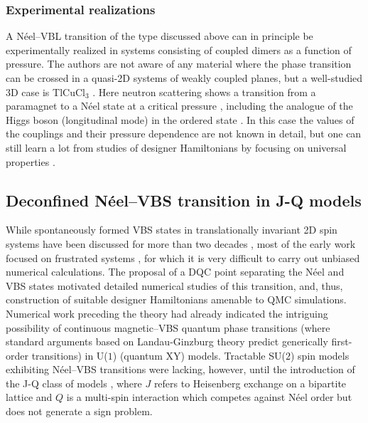 \documentclass[10pt,pre,aps,twocolumn,showpacs,superscriptaddress,floatfix]{revtex4-1}
\begin{document}
\subsubsection{Experimental realizations}
A N\'eel--VBL transition of the type discussed above can in principle be experimentally realized in systems consisting of coupled dimers as a function 
of pressure. The authors are not aware of any material where the phase transition can be crossed in a quasi-2D systems of weakly 
coupled planes, but a well-studied 3D case is TlCuCl$_3$ \cite{Cavadini01,Ruegg04}. Here neutron scattering shows a transition from a paramagnet 
to a N\'eel state at a critical pressure \cite{Ruegg08}, including the analogue of the Higgs boson (longitudinal mode) in the ordered 
state \cite{Sachdev09}. In this case the values of the couplings and their pressure dependence are not known in detail, but one can still learn a lot from 
studies of designer Hamiltonians by focusing on universal properties \cite{Troyer97,Yasuda05,Yao07,Jin12,Oitmaa11}.

\subsection{Deconfined N\'eel--VBS transition in J-Q models}
\label{ss:jq2}
While spontaneously formed VBS states in translationally invariant 2D spin systems have been discussed for more than two decades \cite{Chandra88,Dagotto89,Read89},
most of the early work focused on frustrated systems \cite{Dagotto89,Schulz96,Capriotti01}, for which it is very difficult to carry out unbiased numerical 
calculations. The proposal of a DQC point separating the N\'eel and VBS states motivated detailed numerical studies of this transition, and, thus, construction 
of suitable designer Hamiltonians amenable to QMC simulations. Numerical work preceding the theory \cite{Sandvik02} had already indicated the intriguing possibility 
of continuous magnetic--VBS quantum phase transitions (where standard arguments based on Landau-Ginzburg theory predict generically first-order transitions) in
U($1$) (quantum XY) models. Tractable SU($2$) spin models exhibiting N\'eel--VBS transitions were lacking, however, until the introduction of the J-Q class of 
models \cite{Sandvik07}, where $J$ refers to Heisenberg exchange on a bipartite lattice and $Q$ is a multi-spin interaction which competes against N\'eel 
order but does not generate a sign problem. 
\end{document}
